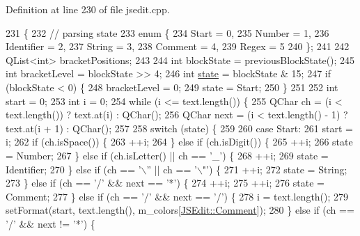 Definition at line 230 of file jsedit.\+cpp.


\begin{DoxyCode}
231 \{
232     \textcolor{comment}{// parsing state}
233     \textcolor{keyword}{enum} \{
234         Start = 0,
235         Number = 1,
236         Identifier = 2,
237         String = 3,
238         Comment = 4,
239         Regex = 5
240     \};
241 
242     QList<int> bracketPositions;
243 
244     \textcolor{keywordtype}{int} blockState = previousBlockState();
245     \textcolor{keywordtype}{int} bracketLevel = blockState >> 4;
246     \textcolor{keywordtype}{int} \hyperlink{json__tokener_8c_a17ba9d3d3f420182822febf73adca0a4}{state} = blockState & 15;
247     \textcolor{keywordflow}{if} (blockState < 0) \{
248         bracketLevel = 0;
249         state = Start;
250     \}
251 
252     \textcolor{keywordtype}{int} start = 0;
253     \textcolor{keywordtype}{int} i = 0;
254     \textcolor{keywordflow}{while} (i <= text.length()) \{
255         QChar ch = (i < text.length()) ? text.at(i) : QChar();
256         QChar next = (i < text.length() - 1) ? text.at(i + 1) : QChar();
257 
258         \textcolor{keywordflow}{switch} (state) \{
259 
260         \textcolor{keywordflow}{case} Start:
261             start = i;
262             \textcolor{keywordflow}{if} (ch.isSpace()) \{
263                 ++i;
264             \} \textcolor{keywordflow}{else} \textcolor{keywordflow}{if} (ch.isDigit()) \{
265                 ++i;
266                 state = Number;
267             \} \textcolor{keywordflow}{else} \textcolor{keywordflow}{if} (ch.isLetter() || ch == \textcolor{charliteral}{'\_'}) \{
268                 ++i;
269                 state = Identifier;
270             \} \textcolor{keywordflow}{else} \textcolor{keywordflow}{if} (ch == \textcolor{charliteral}{'\(\backslash\)''} || ch == \textcolor{charliteral}{'\(\backslash\)"'}) \{
271                 ++i;
272                 state = String;
273             \} \textcolor{keywordflow}{else} \textcolor{keywordflow}{if} (ch == \textcolor{charliteral}{'/'} && next == \textcolor{charliteral}{'*'}) \{
274                 ++i;
275                 ++i;
276                 state = Comment;
277             \} \textcolor{keywordflow}{else} \textcolor{keywordflow}{if} (ch == \textcolor{charliteral}{'/'} && next == \textcolor{charliteral}{'/'}) \{
278                 i = text.length();
279                 setFormat(start, text.length(), m\_colors[\hyperlink{class_j_s_edit_a5a465193a1344e5be9b04f5ff7883213a430947e4b883553d04f618a799095f4d}{JSEdit::Comment}]);
280             \} \textcolor{keywordflow}{else} \textcolor{keywordflow}{if} (ch == \textcolor{charliteral}{'/'} && next != \textcolor{charliteral}{'*'}) \{

\end{DoxyCode}
